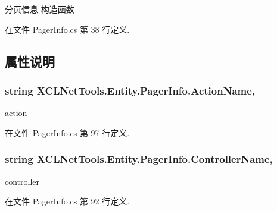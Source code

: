 分页信息 构造函数 



在文件 Pager\-Info.\-cs 第 38 行定义.



\subsection{属性说明}
\hypertarget{class_x_c_l_net_tools_1_1_entity_1_1_pager_info_aa3c26ca4634e5ab5023cc0157e3245b7}{
\subsubsection[{Action\-Name}]{\setlength{\rightskip}{0pt plus 5cm}string X\-C\-L\-Net\-Tools.\-Entity.\-Pager\-Info.\-Action\-Name\hspace{0.3cm}{\ttfamily [get]}, {\ttfamily [set]}}}\label{class_x_c_l_net_tools_1_1_entity_1_1_pager_info_aa3c26ca4634e5ab5023cc0157e3245b7}


action 



在文件 Pager\-Info.\-cs 第 97 行定义.

\hypertarget{class_x_c_l_net_tools_1_1_entity_1_1_pager_info_a7684b1dd21faadcf80c1e2d081660569}{
\subsubsection[{Controller\-Name}]{\setlength{\rightskip}{0pt plus 5cm}string X\-C\-L\-Net\-Tools.\-Entity.\-Pager\-Info.\-Controller\-Name\hspace{0.3cm}{\ttfamily [get]}, {\ttfamily [set]}}}\label{class_x_c_l_net_tools_1_1_entity_1_1_pager_info_a7684b1dd21faadcf80c1e2d081660569}


controller 



在文件 Pager\-Info.\-cs 第 92 行定义.

